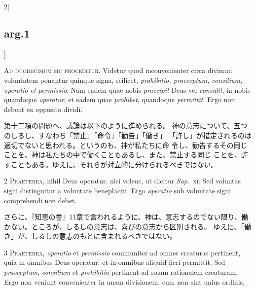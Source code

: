 \documentclass[paper=a4paper,fontsize=10pt,jafontsize=9pt,titlepage]{jlreq}
\begin{document}
\begin{paracol}{2}[\subsection{arg.1}]


{\huge A}{\scshape d duodecimum sic proceditur}. Videtur quod
inconvenienter circa divinam voluntatem ponantur quinque signa,
scilicet, {\itshape prohibitio, praeceptum, consilium, operatio et permissio}. Nam
eadem quae nobis {\itshape praecipit} Deus vel {\itshape consulit}, in nobis quandoque
{\itshape operatur}, et eadem quae {\itshape prohibet}, quandoque {\itshape permittit}. Ergo non debent
ex opposito dividi.

\switchcolumn

第十二項の問題へ、議論は以下のように進められる。
神の意志について、五つのしるし、すなわち「禁止」「命令」「勧告」「働き」
 「許し」が措定されるのは適切でないと思われる。というのも、神が私たちに命
 令し、勧告するその同じことを、神は私たちの中で働くこともあるし、また、禁止する同じ
 ことを、許すこともある。ゆえに、それらが対立的に分けられるべきではない。



{\scshape 2 Praeterea}, nihil Deus operatur, nisi
volens, ut dicitur {\itshape Sap}.~{\scshape xi}. Sed voluntas signi distinguitur a voluntate
beneplaciti. Ergo {\itshape operatio} sub voluntate signi comprehendi non debet.

\switchcolumn

さらに、『知恵の書』11章で言われるように、神は、意志するのでない限り、働
 かない。ところが、しるしの意志は、喜びの意志から区別される。
ゆえに、「働き」が、しるしの意志のもとに含まれるべきではない。



{\scshape 3 Praeterea}, {\itshape operatio} et {\itshape permissio}
communiter ad omnes creaturas pertinent, quia in omnibus Deus operatur,
et in omnibus aliquid fieri permittit. Sed {\itshape praeceptum}, {\itshape consilium} et
{\itshape prohibitio} pertinent ad solam rationalem creaturam. Ergo non veniunt
convenienter in unam divisionem, cum non sint unius ordinis.


\end{paracol}
\end{document}
